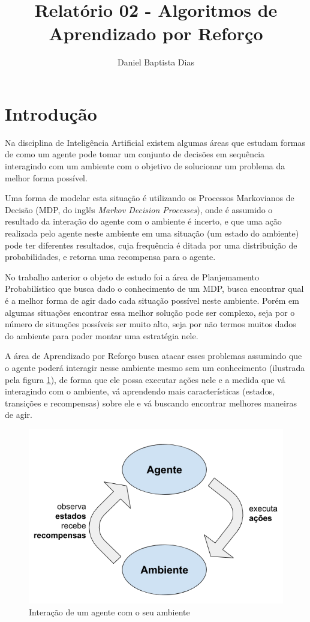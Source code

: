 \documentclass[letterpaper]{article}
\title{Relatório 02 - Algoritmos de Aprendizado por Reforço}
\author{Daniel Baptista Dias}
\begin{document}
\maketitle

\section{Introdução}
\label{sec:introducao}

Na disciplina de Inteligência Artificial existem algumas áreas que estudam formas de como um agente pode tomar um conjunto 
de decisões em sequência interagindo com um ambiente com o objetivo de solucionar um problema da melhor forma possível.

Uma forma de modelar esta situação é utilizando os Processos Markovianos de Decisão (MDP, do 
inglês \textit{Markov Decision Processes})\cite{Puterman-1994}, onde é assumido o resultado da interação do agente com o ambiente é incerto, 
e que uma ação realizada pelo agente neste ambiente em uma situação (um estado do ambiente) pode ter diferentes resultados, cuja frequência é ditada por
uma distribuição de probabilidades, e retorna uma recompensa para o agente.

No trabalho anterior o objeto de estudo foi a área de Planjemamento Probabilístico que busca dado o conhecimento de um MDP, busca encontrar qual é a 
melhor forma de agir dado cada situação possível neste ambiente. Porém em algumas situações encontrar essa melhor solução pode ser complexo, seja por 
o número de situações possíveis ser muito alto, seja por não termos muitos dados do ambiente para poder montar uma estratégia nele.

A área de Aprendizado por Reforço busca atacar esses problemas assumindo que o agente poderá interagir nesse ambiente mesmo sem um conhecimento (ilustrada pela
figura \ref{fig:rf-agent-interaction}), de forma que ele possa executar ações nele e a medida que vá interagindo com o ambiente, vá aprendendo mais características 
(estados, transições e recompensas) sobre ele e vá buscando encontrar melhores maneiras de agir.

\begin{figure}[t]
  \centering
  \includegraphics[width=0.9\columnwidth]{rf-agent-interaction}
  \caption{Interação de um agente com o seu ambiente}
  \label{fig:rf-agent-interaction}
\end{figure}
\end{document}
